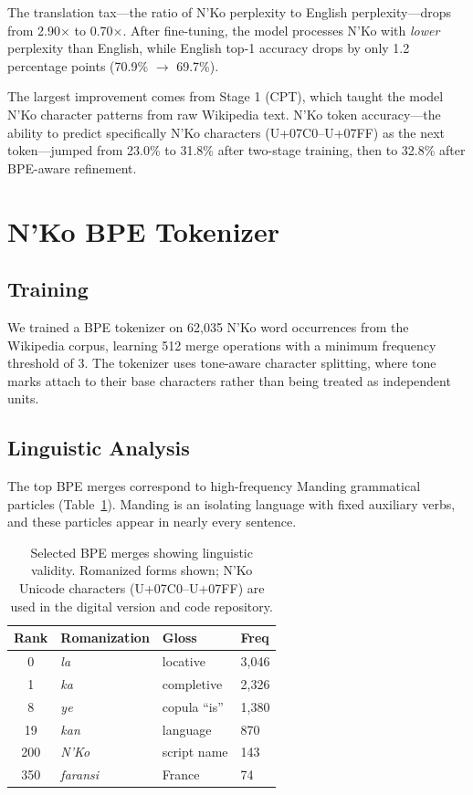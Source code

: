 \documentclass[11pt]{article}
\begin{document}
The translation tax---the ratio of N'Ko perplexity to English perplexity---drops from 2.90$\times$ to 0.70$\times$.
After fine-tuning, the model processes N'Ko with \textit{lower} perplexity than English, while English top-1 accuracy drops by only 1.2 percentage points (70.9\% $\to$ 69.7\%).

The largest improvement comes from Stage 1 (CPT), which taught the model N'Ko character patterns from raw Wikipedia text.
N'Ko token accuracy---the ability to predict specifically N'Ko characters (U+07C0--U+07FF) as the next token---jumped from 23.0\% to 31.8\% after two-stage training, then to 32.8\% after BPE-aware refinement.

\section{N'Ko BPE Tokenizer}
\label{sec:tokenizer}

\subsection{Training}

We trained a BPE tokenizer on 62,035 N'Ko word occurrences from the Wikipedia corpus, learning 512 merge operations with a minimum frequency threshold of 3.
The tokenizer uses tone-aware character splitting, where tone marks attach to their base characters rather than being treated as independent units.

\subsection{Linguistic Analysis}

The top BPE merges correspond to high-frequency Manding grammatical particles (Table~\ref{tab:bpe-merges}).
Manding is an isolating language with fixed auxiliary verbs, and these particles appear in nearly every sentence.

\begin{table}[t]
\centering
\small
\begin{tabular}{clll}
\toprule
\textbf{Rank} & \textbf{Romanization} & \textbf{Gloss} & \textbf{Freq} \\
\midrule
0 & \textit{la} & locative & 3,046 \\
1 & \textit{ka} & completive & 2,326 \\
8 & \textit{ye} & copula ``is'' & 1,380 \\
19 & \textit{kan} & language & 870 \\
200 & \textit{N'Ko} & script name & 143 \\
350 & \textit{faransi} & France & 74 \\
\bottomrule
\end{tabular}
\caption{Selected BPE merges showing linguistic validity. Romanized forms shown; N'Ko Unicode characters (U+07C0--U+07FF) are used in the digital version and code repository.}
\label{tab:bpe-merges}
\end{table}
\end{document}
